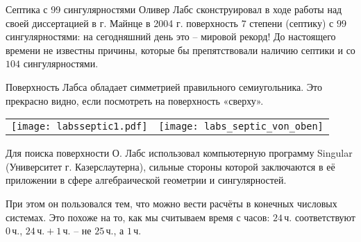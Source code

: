 \begin{surferPage}[Лабс]{Септика с 99 сингулярностями}
Оливер Лабс сконструировал в ходе работы над своей диссертацией в г. Майнце в 2004 г. поверхность $7$ степени (септику) с $99$ сингулярностями: на сегодняшний день это – мировой рекорд! До настоящего времени не известны причины, которые бы препятствовали наличию септики и со $104$ сингулярностями. 

Поверхность Лабса обладает симметрией правильного семиугольника. Это прекрасно видно, если посмотреть на поверхность «сверху». 
    \vspace*{-0.3em}
    \begin{center}
      \begin{tabular}{c@{\qquad}c}
        \texttt{[image: labsseptic1.pdf]}
        &
        \texttt{[image: labs\_septic\_von\_oben]}
      \end{tabular}
    \end{center}
    \vspace*{-0.3em}

Для поиска поверхности О. Лабс использовал компьютерную программу Singular (Университет г. Казерслаутерна), сильные стороны которой заключаются в её приложении в сфере алгебраической геометрии и сингулярностей.

При этом он пользовался тем, что можно вести расчёты в конечных числовых системах. Это похоже на то, как мы считываем время с часов: $24\,$ч. соответствуют $0\,$ч., $24\,\text{ч}. + 1\,$ч. – не $25\,$ч., а $1\,$ч.
\end{surferPage}

